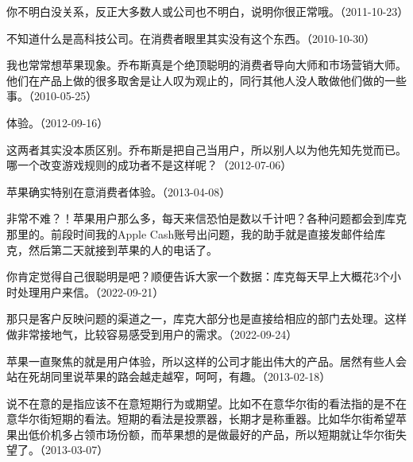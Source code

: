 你不明白没关系，反正大多数人或公司也不明白，说明你很正常哦。（2011-10-23）


不知道什么是高科技公司。在消费者眼里其实没有这个东西。（2010-10-30）

我也常常想苹果现象。乔布斯真是个绝顶聪明的消费者导向大师和市场营销大师。他们在产品上做的很多取舍是让人叹为观止的，同行其他人没人敢做他们做的一些事。（2010-05-25）


体验。（2012-09-16）


这两者其实没本质区别。乔布斯是把自己当用户，所以别人以为他先知先觉而已。哪一个改变游戏规则的成功者不是这样呢？（2012-07-06）


苹果确实特别在意消费者体验。（2013-04-08）


非常不难？！苹果用户那么多，每天来信恐怕是数以千计吧？各种问题都会到库克那里的。前段时间我的Apple Cash账号出问题，我的助手就是直接发邮件给库克，然后第二天就接到苹果的人的电话了。


你肯定觉得自己很聪明是吧？顺便告诉大家一个数据：库克每天早上大概花3个小时处理用户来信。（2022-09-21）


那只是客户反映问题的渠道之一，库克大部分也是直接给相应的部门去处理。这样做非常接地气，比较容易感受到用户的需求。（2022-09-24）

苹果一直聚焦的就是用户体验，所以这样的公司才能出伟大的产品。居然有些人会站在死胡同里说苹果的路会越走越窄，呵呵，有趣。（2013-02-18）


说不在意的是指应该不在意短期行为或期望。比如不在意华尔街的看法指的是不在意华尔街短期的看法。短期的看法是投票器，长期才是称重器。比如华尔街希望苹果出低价机多占领市场份额，而苹果想的是做最好的产品，所以短期就让华尔街失望了。（2013-03-07）


